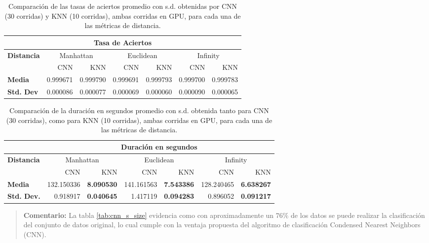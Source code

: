 \documentclass{article}
\begin{document}
\begin{enumerate}
\begin{enumerate}
\begin{table}[H]
    \centering
    \begin{tabular}{lrr|rr|rr}
    \toprule
    \multicolumn{7}{c}{\textbf{Tasa de Aciertos}}\\
    \midrule
    \textbf{Distancia}& \multicolumn{2}{c}{Manhattan}& \multicolumn{2}{c}{Euclidean}&\multicolumn{2}{c}{Infinity}\\
    \toprule
    &CNN&KNN& CNN&KNN & CNN&KNN\\
    \midrule
    \textbf{Media}    & 0.999671 & 0.999790 & 0.999691  & 0.999793 & 0.999700  & 0.999783 \\
    \textbf{Std. Dev} & 0.000086 & 0.000077 & 0.000069  & 0.000060 & 0.000090  & 0.000065 \\
    \bottomrule
\end{tabular}
    \caption{Comparación de las tasas de aciertos promedio con s.d. obtenidas por CNN (30 corridas) y KNN (10 corridas), ambas corridas en GPU, para cada una de las métricas de distancia.}
    \label{tab:cnn_vs_knn_tasa_aciertos}
\end{table}

\begin{table}[H]
    \centering
    \begin{tabular}{lrr|rr|rr}
    \toprule
    &\multicolumn{6}{c}{\textbf{Duración en segundos}}\\
    \midrule
    \textbf{Distancia}&\multicolumn{2}{c}{Manhattan}& \multicolumn{2}{c}{Euclidean}&\multicolumn{2}{c}{Infinity}\\
    &CNN &KNN& CNN &KNN&CNN &KNN\\
    \midrule
    \textbf{Media}&132.150336  &\textbf{8.090530} & 141.161563  &\textbf{7.543386} & 128.240465  &\textbf{6.638267} \\
    \textbf{Std. Dev.}&0.918917  &\textbf{0.040645} & 1.417119  &\textbf{0.094283} & 0.896052  &\textbf{0.091217} \\
    \bottomrule
    \end{tabular}
    \caption{Comparación de la duración en segundos promedio con s.d. obtenida tanto para CNN (30 corridas), como para KNN (10 corridas), ambas corridas en GPU, para cada una de las métricas de distancia.}
    \label{tab:cnn_vs_knn_duracion}
\end{table}

\begin{quote}
    \textbf{Comentario:} La tabla \ref{tab:cnn_s_size} evidencia como con aproximadamente un $76\%$ de los datos se puede realizar la clasificación del conjunto de datos original, lo cual cumple con la ventaja propuesta del algoritmo de clasificación Condensed Nearest Neighbors (CNN). 
    

\end{quote}
\end{enumerate}
\end{enumerate}
\end{document}
